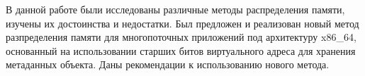 \Conclusion %

В данной работе были исследованы различные методы распределения памяти, изучены их достоинства и недостатки. Был предложен и реализован новый метод разпределения памяти для многопоточных приложений под архитектуру x86\_64, основанный на использовании старших битов виртуального адреса для хранения метаданных объекта. Даны рекомендации к использованию нового метода.

